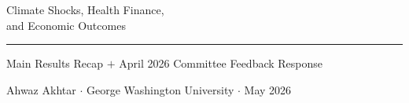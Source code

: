 \documentclass[aspectratio=169,11pt]{beamer}
\begin{document}
\begingroup
{}
\begin{frame}[plain]
  \vspace{0.65cm}
  \hspace{0.6cm}%
  {\color{white}\bfseries\fontsize{22}{28}\selectfont
    \parbox{13cm}{Climate Shocks, Health Finance,\\and Economic Outcomes}}
  \par\vspace{0.45em}
  \hspace{0.6cm}%
  {\color{WarmOrange}\rule{12cm}{2pt}}
  \par\vspace{0.45em}
  \hspace{0.6cm}%
  {\color{Teal}\normalsize Main Results Recap \(+\) April 2026 Committee Feedback Response}
  \par\vspace{0.35em}
  \hspace{0.6cm}%
  {\color{WarmGray}\small Ahwaz Akhtar \(\cdot\) George Washington University \(\cdot\) May 2026}
\end{frame}
\endgroup
\end{document}
